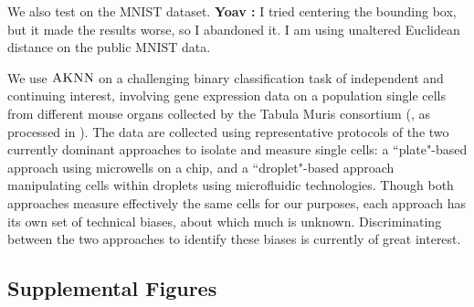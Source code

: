 \documentclass{article}
\newcommand{\algname}{\textsc{AKNN}}
\newcommand{\comment}[3]{{\color{#1} {\bf #2 :} #3}}
\newcommand{\yoav}[1]{\comment{cyan}{Yoav}{#1}}
\begin{document}
We also test on the MNIST dataset. \yoav{I tried centering the bounding box, but it made the results worse, so I abandoned it. I am using unaltered Euclidean distance on the public MNIST data.}

We use $\algname$ on a challenging binary classification task of independent and continuing interest, involving gene expression data on a population single cells from different mouse organs collected by the Tabula Muris consortium (\cite{tabulamuris18}, as processed in \cite{MouseAtlasData}). The data are collected using representative protocols of the two currently dominant approaches to isolate and measure single cells: a ``plate"-based approach using microwells on a chip, and a ``droplet"-based approach manipulating cells within droplets using microfluidic technologies. Though both approaches measure effectively the same cells for our purposes, each approach has its own set of technical biases, about which much is unknown. Discriminating between the two approaches to identify these biases is currently of great interest.


\newpage
\subsection{Supplemental Figures}
\end{document}
